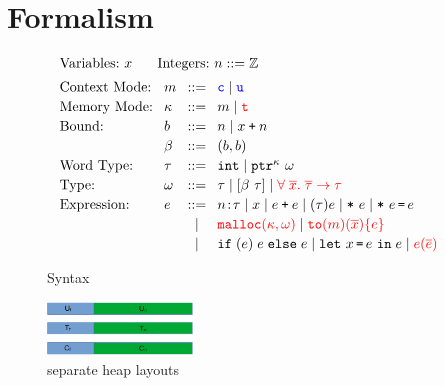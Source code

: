 \section{Formalism}\label{sec:formal}

\begin{figure}
  \small \centering
  \[ \hspace*{-1.5em}
\setlength{\arraycolsep}{4pt}
\begin{array}{l}
\begin{array}{ll}
       \text{Variables:}~ x
& \quad\text{Integers:}~n::=\mathbb{Z} 
\end{array}
\\[0.5em]
\begin{array}{llcllcl}
\text{Context Mode:} & m & ::= & \cmode \mid \umode \\[0.2em]
\text{Memory Mode:} & \kappa & ::= & m \mid \tmodered \\[0.2em]
\text{Bound:} & b & ::= & n \mid x \plus n \\[0.2em]
              & \bvar & ::= & (b,b) \\[0.2em]
  
     \text{Word Type:}& \tau &::=& \tint\mid \tptr{\omega}{\kappa}
\\[0.2em]
\text{Type:}&\omega &::=& \tau \mid \tarrayb{\bvar}{\tau} \mid \textcolor{red}{\tfun{\overline{x}}{\overline{\tau}}{\tau}}
\\[0.2em]
\text{Expression:}& e & ::= & 
\evalue{n}{\tau} \mid x \mid \ebinop{e}{e}\mid \ecast{\tau}{e} \mid \estar{e}\mid\eassign{e}{e} 
  \\[0.2em]
&&\mid& \textcolor{red}{\emalloc{\kappa}{\omega}} \mid \textcolor{red}{\toa{m}{\overline{x}}{e}} \\[0.2em]
&&\mid&\eif{e}{e}{e} \mid  \elet{x}{e}{e} \mid \textcolor{red}{\ecall{e}{\overline{e}}}
\end{array}
    \end{array}
  \]
  \caption{\lang Syntax}
  \label{fig:checkc-syn}
\end{figure}

\begin{figure}
{
\begin{center}
\includegraphics[width=0.35\textwidth]{memory.png}
\end{center}
}
\caption{
    \systemname separate heap layouts
}
  \label{fig:checkc-memory}
\end{figure}


